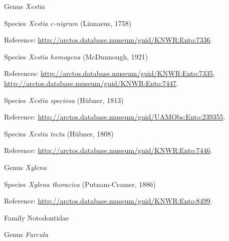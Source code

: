 \documentclass[9pt, article]{memoir}
\begin{document}
\begin{multicols}{2}
\vspace{6pt}\noindent\hspace{30pt}Genus \textit{Xestia}


\vspace{6pt}\noindent\hspace{36pt}Species \textit{Xestia c-nigrum} (Linnaeus, 1758)


\vspace{6pt}Reference: 
\url{http://arctos.database.museum/guid/KNWR:Ento:7336}.

\vspace{6pt}\noindent\hspace{36pt}Species \textit{Xestia homogena} (McDunnough, 1921)


\vspace{6pt}References: 
\url{http://arctos.database.museum/guid/KNWR:Ento:7335}, 
\url{http://arctos.database.museum/guid/KNWR:Ento:7447}.

\vspace{6pt}\noindent\hspace{36pt}Species \textit{Xestia speciosa} (Hübner, 1813)


\vspace{6pt}Reference: 
\url{http://arctos.database.museum/guid/UAMObs:Ento:239355}.

\vspace{6pt}\noindent\hspace{36pt}Species \textit{Xestia tecta} (Hübner, 1808)


\vspace{6pt}Reference: 
\url{http://arctos.database.museum/guid/KNWR:Ento:7446}.

\vspace{6pt}\noindent\hspace{30pt}Genus \textit{Xylena}


\vspace{6pt}\noindent\hspace{36pt}Species \textit{Xylena thoracica} (Putnam-Cramer, 1886)


\vspace{6pt}Reference: 
\url{http://arctos.database.museum/guid/KNWR:Ento:8499}.

\vspace{6pt}\noindent\hspace{24pt}Family Notodontidae


\vspace{6pt}\noindent\hspace{30pt}Genus \textit{Furcula}



\end{multicols}
\end{document}
